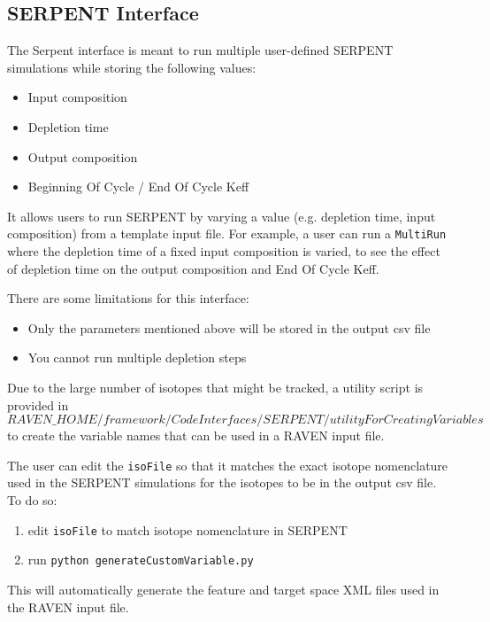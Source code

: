
\subsection{SERPENT Interface}
\label{subsec:serpentInterface}
The Serpent interface is meant to run multiple user-defined SERPENT simulations
while storing the following values: 
\begin{itemize}
\item Input composition
\item Depletion time
\item Output composition
\item Beginning Of Cycle / End Of Cycle Keff
\end{itemize}

It allows users to run SERPENT by varying a value
(e.g. depletion time, input composition) from a template input file.
For example, a user can run a \texttt{MultiRun} where the depletion
time of a fixed input composition is varied, to see the effect of
depletion time on the output composition and End Of Cycle Keff.

There are some limitations for this interface:
\begin{itemize}
\item Only the parameters mentioned above will be stored in the output csv file
\item You cannot run multiple depletion steps
\end{itemize}

Due to the large number of isotopes that might be tracked,
a utility script is provided in
$RAVEN\_HOME/framework/CodeInterfaces/SERPENT/utilityForCreatingVariables$
to create the variable names that can be used in a RAVEN input file.

The user can edit the \texttt{isoFile} so that it
matches the exact isotope nomenclature used in the SERPENT simulations for the isotopes
to be in the output csv file. To do so:

\begin{enumerate}
\item edit \texttt{isoFile} to match isotope nomenclature in SERPENT
\item run \texttt{python generateCustomVariable.py}
\end{enumerate}

This will automatically generate the feature and target space XML files
used in the RAVEN input file.



